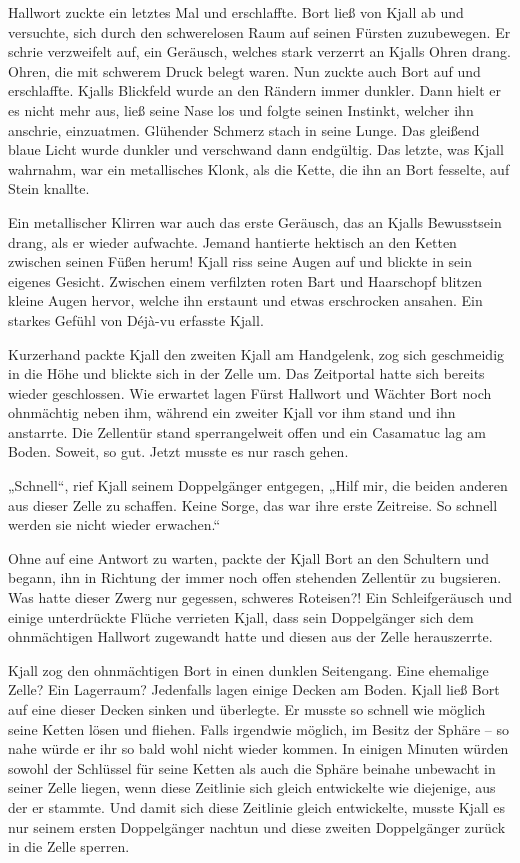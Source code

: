 Hallwort zuckte ein letztes Mal und erschlaffte. Bort ließ von Kjall ab und versuchte, sich durch den schwerelosen Raum auf seinen Fürsten zuzubewegen. Er schrie verzweifelt auf, ein Geräusch, welches stark verzerrt an Kjalls Ohren drang. Ohren, die mit schwerem Druck belegt waren. Nun zuckte auch Bort auf und erschlaffte. Kjalls Blickfeld wurde an den Rändern immer dunkler. Dann hielt er es nicht mehr aus, ließ seine Nase los und folgte seinen Instinkt, welcher ihn anschrie, einzuatmen. Glühender Schmerz stach in seine Lunge. Das gleißend blaue Licht wurde dunkler und verschwand dann endgültig. Das letzte, was Kjall wahrnahm, war ein metallisches Klonk, als die Kette, die ihn an Bort fesselte, auf Stein knallte.\bigskip



Ein metallischer Klirren war auch das erste Geräusch, das an Kjalls Bewusstsein drang, als er wieder aufwachte. Jemand hantierte hektisch an den Ketten zwischen seinen Füßen herum! Kjall riss seine Augen auf und blickte in sein eigenes Gesicht. Zwischen einem verfilzten roten Bart und Haarschopf blitzen kleine Augen hervor, welche ihn erstaunt und etwas erschrocken ansahen. Ein starkes Gefühl von Déjà-vu erfasste Kjall.

Kurzerhand packte Kjall den zweiten Kjall am Handgelenk, zog sich geschmeidig in die Höhe und blickte sich in der Zelle um. Das Zeitportal hatte sich bereits wieder geschlossen. Wie erwartet lagen Fürst Hallwort und Wächter Bort noch ohnmächtig neben ihm, während ein zweiter Kjall vor ihm stand und ihn anstarrte. Die Zellentür stand sperrangelweit offen und ein Casamatuc lag am Boden. Soweit, so gut. Jetzt musste es nur rasch gehen.

„Schnell“, rief Kjall seinem Doppelgänger entgegen, „Hilf mir, die beiden anderen aus dieser Zelle zu schaffen. Keine Sorge, das war ihre erste Zeitreise. So schnell werden sie nicht wieder erwachen.“

Ohne auf eine Antwort zu warten, packte der Kjall Bort an den Schultern und begann, ihn in Richtung der immer noch offen stehenden Zellentür zu bugsieren. Was hatte dieser Zwerg nur gegessen, schweres Roteisen?! Ein Schleifgeräusch und einige unterdrückte Flüche verrieten Kjall, dass sein Doppelgänger sich dem ohnmächtigen Hallwort zugewandt hatte und diesen aus der Zelle herauszerrte.

Kjall zog den ohnmächtigen Bort in einen dunklen Seitengang. Eine ehemalige Zelle? Ein Lagerraum? Jedenfalls lagen einige Decken am Boden. Kjall ließ Bort auf eine dieser Decken sinken und überlegte. Er musste so schnell wie möglich seine Ketten lösen und fliehen. Falls irgendwie möglich, im Besitz der Sphäre – so nahe würde er ihr so bald wohl nicht wieder kommen. In einigen Minuten würden sowohl der Schlüssel für seine Ketten als auch die Sphäre beinahe unbewacht in seiner Zelle liegen, wenn diese Zeitlinie sich gleich entwickelte wie diejenige, aus der er stammte. Und damit sich diese Zeitlinie gleich entwickelte, musste Kjall es nur seinem ersten Doppelgänger nachtun und diese zweiten Doppelgänger zurück in die Zelle sperren.

